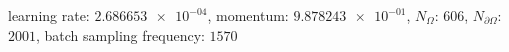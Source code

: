 learning rate: $\num[scientific-notation=true]{2.686653e-04}$, momentum: $\num[scientific-notation=true]{9.878243e-01}$, $N_{\Omega}$: $\num[scientific-notation=false]{606}$, $N_{\partial\Omega}$: $\num[scientific-notation=false]{2001}$, batch sampling frequency: $\num[scientific-notation=false]{1570}$